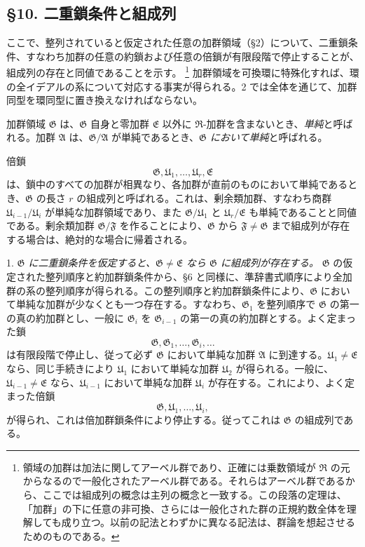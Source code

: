 \documentclass[11pt]{article}
\providecommand{\mR}{\mathfrak{R}}
\providecommand{\mA}{\mathfrak{A}}
\providecommand{\mE}{\mathfrak{E}}
\providecommand{\mF}{\mathfrak{F}}
\providecommand{\mG}{\mathfrak{G}}
\providecommand{\mU}{\mathfrak{U}}
\begin{document}
\subsection*{§10. 二重鎖条件と組成列}

ここで、整列されていると仮定された任意の加群領域（§2）について、二重鎖条件、すなわち加群の任意の約鎖および任意の倍鎖が有限段階で停止することが、組成列の存在と同値であることを示す。
\footnote{領域の加群は加法に関してアーベル群であり、正確には乗数領域が $\mR$ の元からなるので一般化されたアーベル群である。それらはアーベル群であるから、ここでは組成列の概念は主列の概念と一致する。この段落の定理は、「加群」の下に任意の非可換、さらには一般化された群の正規約数全体を理解しても成り立つ。以前の記法とわずかに異なる記法は、群論を想起させるためのものである。}
加群領域を可換環に特殊化すれば、環の全イデアルの系について対応する事実が得られる。2 では全体を通じて、加群同型を環同型に置き換えなければならない。

加群領域 $\mG$ は、$\mG$ 自身と零加群 $\mE$ 以外に $\mR$-加群を含まないとき、\emph{単純}と呼ばれる。加群 $\mA$ は、$\mG/\mA$ が単純であるとき、\emph{$\mG$ において単純}と呼ばれる。

倍鎖
\[
        \mG,\mU_1,\ldots,\mU_r,\mE
\]
は、鎖中のすべての加群が相異なり、各加群が直前のものにおいて単純であるとき、$\mG$ の長さ $r$ の組成列と呼ばれる。これは、剰余類加群、すなわち商群 $\mU_{i-1}/\mU_i$ が単純な加群領域であり、また $\mG/\mU_1$ と $\mU_r/\mE$ も単純であることと同値である。剰余類加群 $\mG/\mF$ を作ることにより、$\mG$ から $\mF\ne\mG$ まで組成列が存在する場合は、絶対的な場合に帰着される。

1. \emph{$\mG$ に二重鎖条件を仮定すると、$\mG\ne\mE$ なら $\mG$ に組成列が存在する。} $\mG$ の仮定された整列順序と約加群鎖条件から、§6 と同様に、準辞書式順序により全加群の系の整列順序が得られる。この整列順序と約加群鎖条件により、$\mG$ において単純な加群が少なくとも一つ存在する。すなわち、$\mG_1$ を整列順序で $\mG$ の第一の真の約加群とし、一般に $\mG_i$ を $\mG_{i-1}$ の第一の真の約加群とする。よく定まった鎖
\[
        \mG,\mG_1,\ldots,\mG_i,\ldots
\]
は有限段階で停止し、従って必ず $\mG$ において単純な加群 $\mA$ に到達する。$\mU_1\ne\mE$ なら、同じ手続きにより $\mU_1$ において単純な加群 $\mU_2$ が得られる。一般に、$\mU_{i-1}\ne\mE$ なら、$\mU_{i-1}$ において単純な加群 $\mU_i$ が存在する。これにより、よく定まった倍鎖
\[
        \mG,\mU_1,\ldots,\mU_i,
\]
が得られ、これは倍加群鎖条件により停止する。従ってこれは $\mG$ の組成列である。
\end{document}
